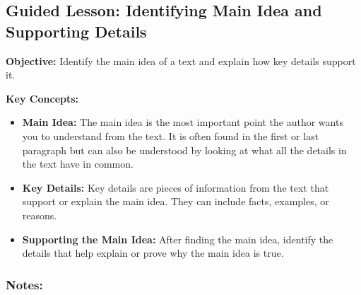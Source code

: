 \documentclass[12pt]{article}
\title{}
\date{}
\begin{document}
\subsection*{Guided Lesson: Identifying Main Idea and Supporting Details}
\onehalfspacing

\begin{tcolorbox}[colframe=black!40, colback=gray!5, 
coltitle=black, colbacktitle=black!20, fonttitle=\bfseries\Large, 
title=Learning Objective, halign title=center, left=5pt, right=5pt, top=5pt, bottom=15pt]
\textbf{Objective:} Identify the main idea of a text and explain how key details support it.
\end{tcolorbox}


\vspace{1em}

\begin{tcolorbox}[colframe=black!60, colback=white, 
coltitle=black, colbacktitle=black!15, fonttitle=\bfseries\Large, 
title=Key Concepts and Vocabulary, halign title=center, left=10pt, right=10pt, top=10pt, bottom=15pt]
\textbf{Key Concepts:}
\begin{itemize}
    \item \textbf{Main Idea:} The main idea is the most important point the author wants you to understand from the text. It is often found in the first or last paragraph but can also be understood by looking at what all the details in the text have in common.
    \item \textbf{Key Details:} Key details are pieces of information from the text that support or explain the main idea. They can include facts, examples, or reasons.
    \item \textbf{Supporting the Main Idea:} After finding the main idea, identify the details that help explain or prove why the main idea is true.
\end{itemize}

\end{tcolorbox}

\vspace{1em}

\subsubsection*{Notes:}
\noindent \underline{\hspace{17cm}} \\[1.2cm]
\noindent \underline{\hspace{17cm}} \\[1.2cm]
\noindent \underline{\hspace{17cm}} \\[1.2cm]
\end{document}

